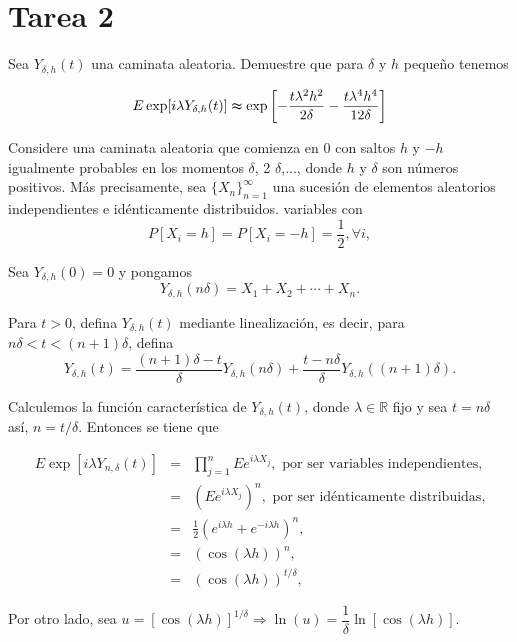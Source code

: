 \documentclass[
  letterpaper,
  DIV=11,
  numbers=noendperiod]{scrreprt}
\begin{document}

\hypertarget{tarea-2}{%
\chapter{Tarea 2}\label{tarea-2}}

\newtheorem{demos}{Solución}
\newtheorem{teor}{Ejercicio}

Sea \(Y_{\delta,h}(t)\) una caminata aleatoria. Demuestre que para
\(\delta\) y \(h\) pequeño tenemos

\[
E\exp[i\lambda Y_{\delta,h}(t)]\thickapprox\exp\left[-\frac{t\lambda^{2}h^{2}}{2\delta}-\frac{t\lambda^{4}h^{4}}{12\delta}\right]
\]

Considere una caminata aleatoria que comienza en 0 con saltos \(h\) y
\(-h\) igualmente probables en los momentos \(\delta\), 2
\(\delta\),\(\dots\), donde \(h\) y \(\delta\) son números positivos.
Más precisamente, sea \(\{X_{n}\}_{n=1}^{\infty}\) una sucesión de
elementos aleatorios independientes e idénticamente distribuidos.
variables con \[
P\left[X_{i}=h\right]=P\left[X_{i}=-h\right]=\dfrac{1}{2},\forall i,
\]

Sea \(Y_{\delta,h}(0)=0\) y pongamos \[
Y_{\delta,h}(n\delta)=X_{1}+X_{2}+\cdots+X_{n}.
\]

Para \(t>0\), defina \(Y_{\delta,h}(t)\) mediante linealización, es
decir, para \(n\delta<t<(n + 1)\delta\), defina \[
Y_{\delta,h}(t)=\frac{(n+1)\delta-t}{\delta}Y_{\delta,h}(n\delta)+\frac{t-n\delta}{\delta}Y_{\delta,h}((n+1)\delta).
\]

Calculemos la función característica de \(Y_{\delta,h}(t)\), donde
\(\lambda\in\mathbb{R}\) fijo y sea \(t=n\delta\) así, \(n=t/\delta\).
Entonces se tiene que

\begin{eqnarray}\label{1}
    E\exp\left[i\lambda Y_{n,\delta}\left(t\right)\right] & = & \prod_{j=1}^{n}Ee^{i\lambda X_{j}},\text{ por ser variables independientes,}\nonumber\\
    & = & (Ee^{i\lambda X_{j}})^{n},\text{ por ser idénticamente distribuidas,}\nonumber\\
    & = & \frac{1}{2}(e^{i\lambda h}+e^{-i\lambda h})^{n},\nonumber\\
    & = & (\cos(\lambda h))^{n},\nonumber\\
    & = & (\cos(\lambda h))^{t/\delta},
\end{eqnarray}

Por otro lado, sea
\(u=\left[\cos\left(\lambda h\right)\right]^{1/\delta}\Rightarrow\ln\left(u\right)=\dfrac{1}{\delta}\ln\left[\cos\left(\lambda h\right)\right]\).
\end{document}
